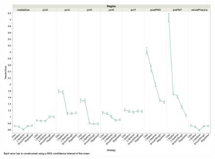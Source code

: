 \begin{figure}[ht]
    \centering
    \includegraphics[scale=0.15]{Figures/rendered_files/error_by_strategy_synthetic}
    \decoRule
    \caption[Error by strategy in the synthetic data set]{}
    \label{fig:PercentErrorSynthetic}
\end{figure}